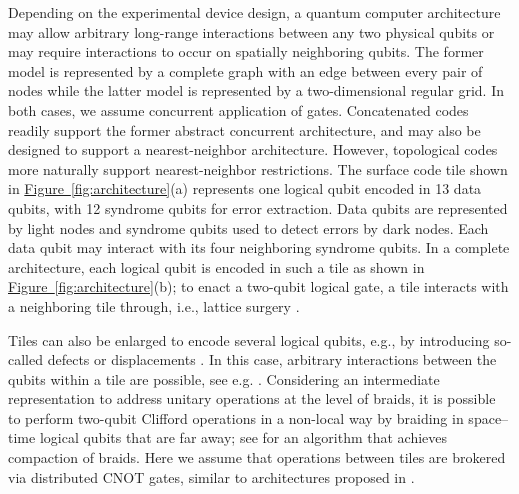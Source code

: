 \documentclass[conference]{IEEEtran}
\newcommand{\fig}[1]{\hyperref[fig:#1]{Figure~\ref*{fig:#1}}}
\begin{document}
Depending on the experimental device design, a quantum computer architecture may allow arbitrary long-range interactions between any two physical qubits or may require interactions to occur on spatially neighboring qubits. The former model is represented by a complete graph with an edge between every pair of nodes while the latter model is represented by a two-dimensional regular grid. In both cases, we assume concurrent application of gates. 
Concatenated codes readily support the former abstract concurrent architecture, and may also be designed to support a nearest-neighbor architecture.  However, topological codes more naturally support nearest-neighbor restrictions.
The surface code tile shown in \fig{architecture}(a) represents one logical qubit encoded in 13 data qubits, with 12 syndrome qubits for error extraction.  Data qubits are represented by light nodes and syndrome qubits used to detect errors by dark nodes.  Each data qubit may interact with its four neighboring syndrome qubits.  In a complete architecture, each logical qubit is encoded in such a tile as shown in \fig{architecture}(b); to enact a two-qubit logical gate, a tile interacts with a neighboring tile through, i.e., lattice surgery \cite{HFD+:2012}.

Tiles can also be enlarged to encode several logical qubits, e.g., by introducing so-called defects \cite{Fowl12f} or displacements \cite{HG:2015}. In this case, arbitrary interactions between the qubits within a tile are possible, see e.g. \cite{HFD+:2012,PF:2015,LB:2015}. 
Considering an intermediate representation to address unitary operations at the level of braids, it is possible to perform two-qubit Clifford operations in a non-local way by braiding in space--time logical qubits that are far away; see \cite{PF:2013} for an algorithm that achieves compaction of braids. Here we assume that operations between tiles are brokered via distributed CNOT gates, similar to architectures proposed in \cite{MFC:2011,vMNM+:2006,vMeter:2014,LB:2015}. 
\end{document}
